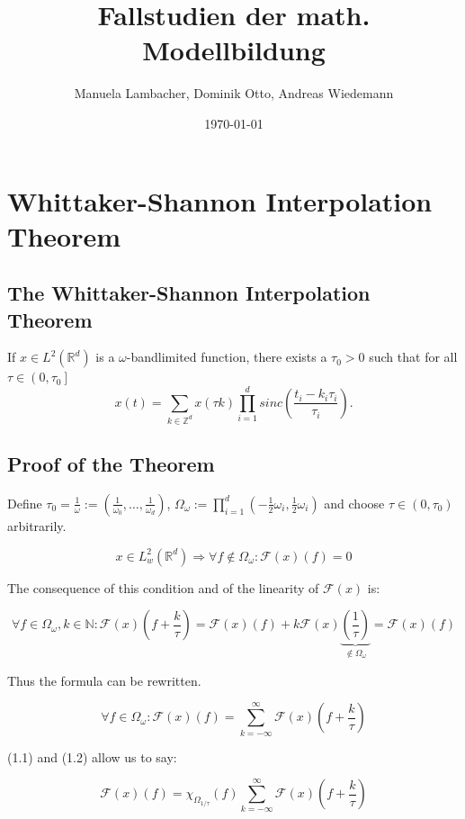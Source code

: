 \documentclass[a4paper, 11pt]{scrreprt}
\title{Fallstudien der math. Modellbildung}
\author{Manuela Lambacher, Dominik Otto, Andreas Wiedemann}
\date{\today}
\newcommand{\RR}{\mathbb{R}}
\newcommand{\ZZ}{\mathbb{Z}}
\newcommand{\NN}{\mathbb{N}}
\newcommand{\FF}{\mathcal{F}}
\begin{document}
\parindent 0pt
\maketitle
\tableofcontents

\chapter{Whittaker-Shannon Interpolation Theorem}

\section{The Whittaker-Shannon Interpolation Theorem}
If \(x \in L^2(\RR^d)\) is a \(\omega\)-bandlimited function, there exists a \(\tau_0 > 0\) such that for all \(\tau \in \left(0,\tau_0\right]\)
\[x(t) = \sum_{k \in \ZZ^d} x(\tau k) \prod_{i=1}^d sinc\left(\frac{t_i-k_i \tau_i}{\tau_i}\right).\]

\section{Proof of the Theorem}
Define \(\tau_0 = \frac{1}{\omega} := \left(\frac{1}{\omega_0}, \ldots, \frac{1}{\omega_d}\right)\), \(\Omega_{\omega} := \prod_{i=1}^d \left(-\frac{1}{2}\omega_i ,\frac{1}{2}\omega_i\right)\) and choose \(\tau \in (0,\tau_0)\) arbitrarily.

\begin{equation}
x \in L^2_w(\RR^d) \Rightarrow \forall f\notin \Omega_{\omega}: \FF(x)(f) = 0
\end{equation}

The consequence of this condition and of the linearity of \(\FF(x)\) is:

\[\forall f\in \Omega_{\omega}, k \in \NN: \FF(x)\left(f+\frac{k}{\tau}\right) = \FF(x)(f) + k \FF(x)\underbrace{\left(\frac{1}{\tau}\right)}_{\notin \Omega_{\omega}} = \FF(x)(f)\]

Thus the formula can be rewritten.

\begin{equation}
\forall f \in \Omega_{\omega}: \FF(x)(f) = \sum_{k=-\infty}^\infty \FF(x)\left( f+\frac{k}{\tau}\right)
\end{equation} 

(1.1) and (1.2) allow us to say:

\[\FF(x)(f) = \chi_{\Omega_{1/\tau}}(f) \sum_{k=-\infty}^\infty \FF(x)\left(f+\frac{k}{\tau}\right)\]
\end{document}
